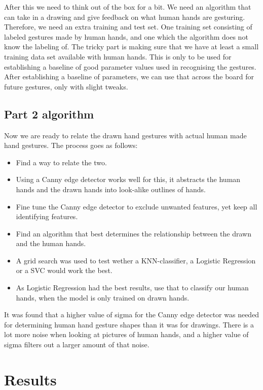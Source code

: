 \documentclass[11pt,a4paper]{article}
\begin{document}
After this we need to think out of the box for a bit. We need an algorithm that can take in a drawing and give feedback on what human hands are gesturing. Therefore, we need an extra training and test set. One training set consisting of labeled gestures made by human hands, and one which the algorithm does not know the labeling of. The tricky part is making sure that we have at least a small training data set available with human hands. This is only to be used for establishing a baseline of good parameter values used in recognising the gestures. After establishing a baseline of parameters, we can use that across the board for future gestures, only with slight tweaks.


\subsection{Part 2 algorithm}
\label{sec:part-2-algorithm}

Now we are ready to relate the drawn hand gestures with actual human made hand gestures. The process goes as follows:

\begin{itemize}
\item Find a way to relate the two.
\item Using a Canny edge detector works well for this, it abstracts the human hands and the drawn hands into look-alike outlines of hands.
\item Fine tune the Canny edge detector to exclude unwanted features, yet keep all identifying features.
\item Find an algorithm that best determines the relationship between the drawn and the human hands.
\item A grid search was used to test wether a KNN-classifier, a Logistic Regression or a SVC would work the best.
\item As Logistic Regression had the best results, use that to classify our human hands, when the model is only trained on drawn hands.
\end{itemize}

It was found that a higher value of sigma for the Canny edge detector was needed for determining human hand gesture shapes than it was for drawings. There is a lot more noise when looking at pictures of human hands, and a higher value of sigma filters out a larger amount of that noise.

\section{Results}
\label{sec:results}
\end{document}
